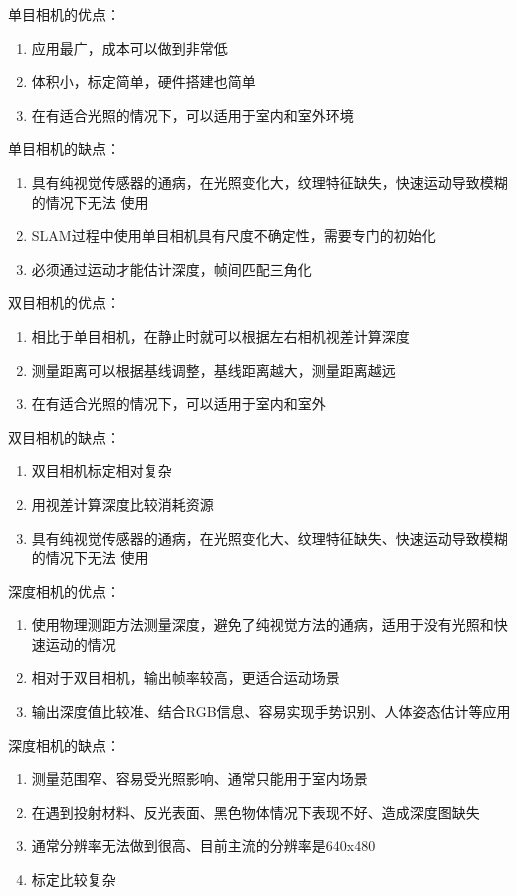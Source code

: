 \documentclass[10pt]{article}
\begin{document}
\noindent 单目相机的优点：
\begin{enumerate}
    \item 应用最广，成本可以做到非常低
    \item 体积小，标定简单，硬件搭建也简单
    \item 在有适合光照的情况下，可以适用于室内和室外环境
\end{enumerate}
\noindent 单目相机的缺点：
\begin{enumerate}
    \item 具有纯视觉传感器的通病，在光照变化大，纹理特征缺失，快速运动导致模糊的情况下无法
    使用
    \item SLAM过程中使用单目相机具有尺度不确定性，需要专门的初始化
    \item 必须通过运动才能估计深度，帧间匹配三角化
\end{enumerate}
双目相机的优点：
\begin{enumerate}
    \item 相比于单目相机，在静止时就可以根据左右相机视差计算深度
    \item 测量距离可以根据基线调整，基线距离越大，测量距离越远
    \item 在有适合光照的情况下，可以适用于室内和室外
\end{enumerate}
双目相机的缺点：
\begin{enumerate}
    \item 双目相机标定相对复杂
    \item 用视差计算深度比较消耗资源
    \item 具有纯视觉传感器的通病，在光照变化大、纹理特征缺失、快速运动导致模糊的情况下无法
    使用
\end{enumerate}
深度相机的优点：
\begin{enumerate}
    \item 使用物理测距方法测量深度，避免了纯视觉方法的通病，适用于没有光照和快速运动的情况
    \item 相对于双目相机，输出帧率较高，更适合运动场景
    \item 输出深度值比较准、结合RGB信息、容易实现手势识别、人体姿态估计等应用
\end{enumerate}
深度相机的缺点：
\begin{enumerate}
    \item 测量范围窄、容易受光照影响、通常只能用于室内场景
    \item 在遇到投射材料、反光表面、黑色物体情况下表现不好、造成深度图缺失
    \item 通常分辨率无法做到很高、目前主流的分辨率是640x480
    \item 标定比较复杂
\end{enumerate}
\end{document}

